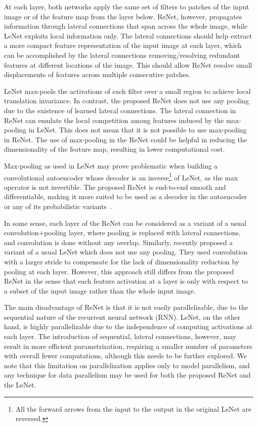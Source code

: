 \documentclass{article} \usepackage{nips15submit_e,times}
\begin{document}
At each layer, both networks apply the same set of filters to patches of the
input image or of the feature map from the layer below. ReNet, however,
propagates information through lateral connections that span across the whole
image, while LeNet exploits local information only. The lateral connections
should help extract a more compact feature representation of the input image at
each layer, which can be accomplished by the lateral connections
removing/resolving redundant features at different locations of the image. This
should allow ReNet resolve small displacements of features across multiple
consecutive patches. 


LeNet max-pools the activations of each filter over a small region to achieve
local translation invariance. In contrast, the proposed ReNet does not use any
pooling due to the existence of learned lateral connections. The lateral
connection in ReNet can emulate the local competition among features induced by
the max-pooling in LeNet.  This does not mean that it is not possible to use
max-pooling in ReNet. The use of max-pooling in the ReNet could be helpful in
reducing the dimensionality of the feature map, resulting in lower computational
cost. 

Max-pooling as used in LeNet may prove problematic when building a
convolutional autoencoder whose decoder is an inverse\footnote{
    All the forward arrows from the input to the output in the original LeNet
    are reversed.
}
of LeNet, as the max operator is not invertible. The proposed
ReNet is end-to-end smooth and differentiable, making it more suited to be used
as a decoder in the autoencoder or any of its probabilistic variants~\citep[see,
e.g.,][]{Kingma+Welling-ICLR2014}.

In some sense, each layer of the ReNet can be considered as a variant of a usual
convolution+pooling layer, where pooling is replaced with lateral connections,
and convolution is done without any overlap. Similarly, \citet{Springenberg2014}
recently proposed a variant of a usual LeNet which does not use any pooling.
They used convolution with a larger stride to compensate for the lack of
dimensionality reduction by pooling at each layer. However, this approach still
differs from the proposed ReNet in the sense that each feature activation at a
layer is only with respect to a subset of the input image rather than the whole
input image.

The main disadvantage of ReNet is that it is not easily parallelizable, due to
the sequential nature of the recurrent neural network (RNN). LeNet, on the other
hand, is highly parallelizable due to the independence of computing activations
at each layer. The introduction of sequential, lateral connections, however, may
result in more efficient parametrization, requiring a smaller number of
parameters with overall fewer computations, although this needs to be further
explored. We note that this limitation on parallelization applies only to
model parallelism, and any technique for data parallelism may be used for both 
the proposed ReNet and the LeNet.
\end{document}

